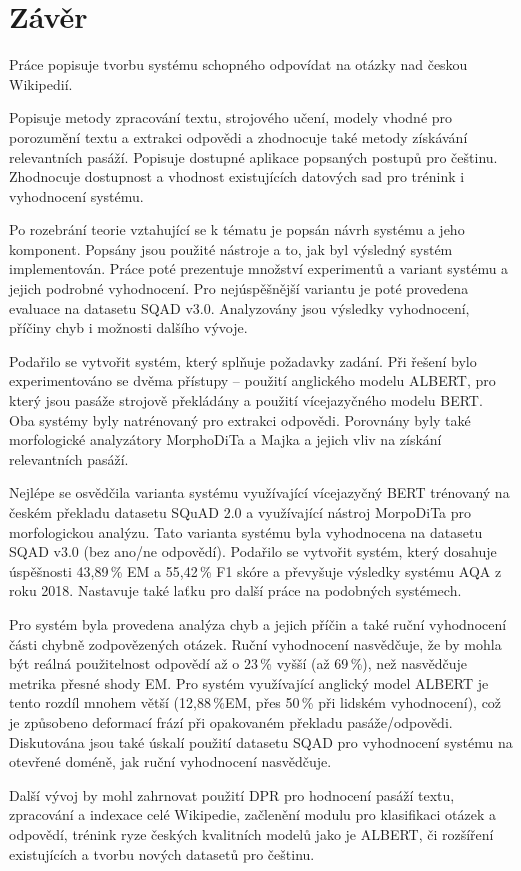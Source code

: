 \chapter{Závěr}
\label{conclusion}
Práce popisuje tvorbu systému schopného odpovídat na otázky nad českou Wikipedií.\par
Popisuje metody zpracování textu, strojového učení, modely vhodné pro porozumění textu a extrakci odpovědi a zhodnocuje také metody získávání relevantních pasáží. Popisuje dostupné aplikace popsaných postupů pro češtinu. Zhodnocuje dostupnost a vhodnost existujících datových sad pro trénink i vyhodnocení systému.\par
Po rozebrání teorie vztahující se k tématu je popsán návrh systému a jeho komponent. Popsány jsou použité nástroje a to, jak byl výsledný systém implementován. Práce poté prezentuje množství experimentů a variant systému a jejich podrobné vyhodnocení. Pro nejúspěšnější variantu je poté provedena evaluace na datasetu SQAD v3.0. Analyzovány jsou výsledky vyhodnocení, příčiny chyb i možnosti dalšího vývoje.\par
Podařilo se vytvořit systém, který splňuje požadavky zadání. Při řešení bylo experimentováno se dvěma přístupy -- použití anglického modelu ALBERT, pro který jsou pasáže strojově překládány a použití vícejazyčného modelu BERT. Oba systémy byly natrénovaný pro extrakci odpovědi. Porovnány byly také morfologické analyzátory MorphoDiTa a Majka a jejich vliv na získání relevantních pasáží.\par
Nejlépe se osvědčila varianta systému využívající vícejazyčný BERT trénovaný na českém překladu datasetu SQuAD 2.0 a využívající nástroj MorpoDiTa pro morfologickou analýzu. Tato varianta systému byla vyhodnocena na datasetu SQAD v3.0 (bez ano/ne odpovědí). Podařilo se vytvořit systém, který dosahuje úspěšnosti 43,89\,\% EM a 55,42\,\% F1 skóre a převyšuje výsledky systému AQA z roku 2018. Nastavuje také laťku pro další práce na podobných systémech.\par
Pro systém byla provedena analýza chyb a jejich příčin a také ruční vyhodnocení části chybně zodpovězených otázek. Ruční vyhodnocení nasvědčuje, že by mohla být reálná použitelnost odpovědí až o 23\,\% vyšší (až 69\,\%), než nasvědčuje metrika přesné shody EM. Pro systém využívající anglický model ALBERT je tento rozdíl mnohem větší (12,88\,\%EM, přes 50\,\% při lidském vyhodnocení), což je způsobeno deformací frází při opakovaném překladu pasáže/odpovědi. Diskutována jsou také úskalí použití datasetu SQAD pro vyhodnocení systému na otevřené doméně, jak ruční vyhodnocení nasvědčuje.\par
Další vývoj by mohl zahrnovat použití DPR pro hodnocení pasáží textu, zpracování a indexace celé Wikipedie, začlenění modulu pro klasifikaci otázek a odpovědí, trénink ryze českých kvalitních modelů jako je ALBERT, či rozšíření existujících a tvorbu nových datasetů pro češtinu.
